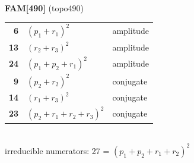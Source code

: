 \documentclass[10pt]{article}
\begin{document}
\begin{minipage}[t]{0.48\textwidth}
{}\\[2mm]\textbf{FAM[490]} (topo490)\\[2pt]{\footnotesize\begin{tabular}{@{}r@{\ \ }l@{\ \ }l@{}}\textbf{6} & $(p_1+r_1)^2$ & amplitude\\
\textbf{13} & $(r_2+r_3)^2$ & amplitude\\
\textbf{24} & $(p_1+p_2+r_1)^2$ & amplitude\\
\textbf{9} & $(p_2+r_2)^2$ & conjugate\\
\textbf{14} & $(r_1+r_3)^2$ & conjugate\\
\textbf{23} & $(p_2+r_1+r_2+r_3)^2$ & conjugate\\\end{tabular}}\\[2pt]{\scriptsize irreducible numerators: 27 = $(p_1+p_2+r_1+r_2)^2$}\end{minipage}

\bigskip
\end{document}
